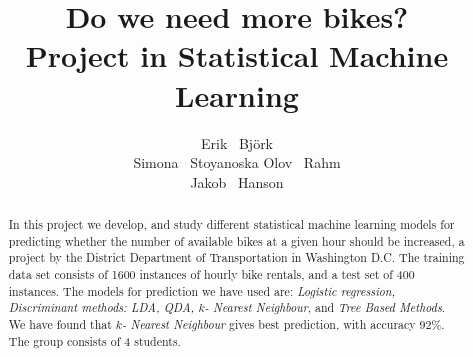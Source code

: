 \documentclass{article}
\title{Do we need more bikes?\\
Project in Statistical Machine Learning}
\author{
  Erik ~Björk\\
  \AND
  Simona ~Stoyanoska
  \AND
  Olov ~Rahm\\
  \AND
  Jakob ~Hanson\\
}
\begin{document}
\maketitle

\begin{abstract}
  In this project we develop, and study different statistical machine learning models for predicting whether the number of available bikes 
  at a given hour should be increased, a project by the District Department of Transportation in Washington D.C. The training data set consists 
  of 1600 instances of hourly bike rentals, and a test set of 400 instances. The models for prediction we have used are: 
  \emph{Logistic regression, Discriminant methods: LDA, QDA, $k$- Nearest Neighbour}, and \emph{Tree Based Methods}. 
  We have found that \emph{$k$- Nearest Neighbour} gives best prediction, with accuracy $92\%$.\\
  The group consists of 4 students.
\end{abstract}
\pagebreak









\appendix


\end{document}
